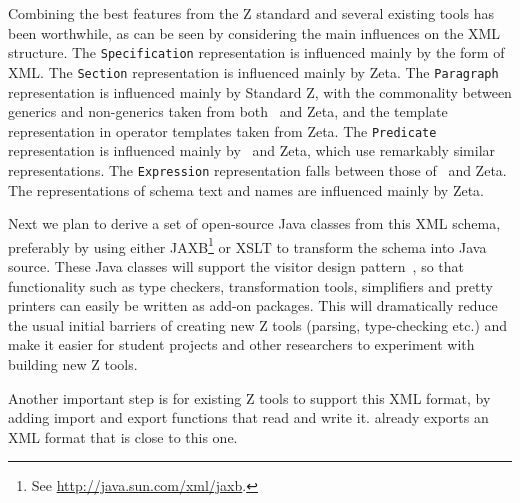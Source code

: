 \documentclass{llncs}  %
\newcommand{\Zeta}{Zeta}
\begin{document}
Combining the best features from the Z standard and several existing
tools has been worthwhile,
as can be seen by considering the main influences on the XML structure.
The \texttt{Specification} representation is influenced mainly by the form
of XML. 
The \texttt{Section} representation is influenced mainly by \Zeta.
The \texttt{Paragraph} representation is influenced mainly by Standard Z,
with the commonality between generics and non-generics taken from
both \CADiZ\ and \Zeta,
and the template representation in operator templates taken from \Zeta.
The \texttt{Predicate} representation is influenced mainly by \CADiZ\ and
\Zeta, which use remarkably similar representations.
The \texttt{Expression} representation falls between those of \CADiZ\ and
\Zeta.  The representations of schema text and names 
are influenced mainly by \Zeta.

Next we plan to derive a set of open-source Java classes from this XML
schema, preferably by using either JAXB\footnote{See
  \url{http://java.sun.com/xml/jaxb}.} or XSLT to 
transform the schema into Java source. 
These Java classes will support the visitor design
pattern~\cite{gamma:design-patts95}, so that functionality such as type
checkers, 
transformation tools, simplifiers and pretty printers can easily be written
as add-on packages.  This will dramatically reduce the usual initial
barriers of creating new Z tools (parsing, type-checking etc.) and make it
easier for student projects and other researchers to experiment with
building new Z tools.

Another important step is for existing Z tools to support this
XML format, by adding import and export functions that read and write it.
{\CADiZ} already exports an XML format that is close to this one.

\begin{small}


\end{small}

\newpage
\appendix
\end{document}
